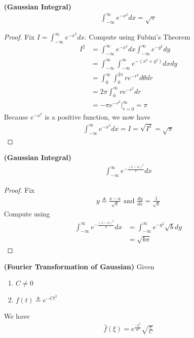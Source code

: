 \documentclass{report}
\begin{document}
\begin{theorem}
\label{Gau1} 
\textbf{(Gaussian Integral)} 
\begin{align*}
\int_{-\infty}^{\infty}e^{-x^2}dx=\sqrt{\pi} 
\end{align*}
\end{theorem}
\begin{proof}
Fix $I=\int_{-\infty}^{\infty}e^{-x^2}dx$. Compute using Fubini's Theorem 
\begin{align*}
I^2&=\int_{-\infty}^{\infty}e^{-x^2}dx\int_{-\infty}^{\infty}e^{-y^2}dy\\
&=\int_{-\infty}^{\infty}\int_{-\infty}^{\infty}e^{-(x^2+y^2)}dxdy\\
&=\int_0^{\infty}\int_{0}^{2\pi}re^{-r^2}d\theta dr\\
&=2\pi \int_0^{\infty}re^{-r^2}dr\\
&=-\pi e^{-r^2}\big|_{r=0}^{\infty}=\pi
\end{align*}
Because $e^{-x^2}$ is a positive function, we now have 
\begin{align*}
\int_{-\infty}^{\infty}e^{-x^2}dx=I=\sqrt{I^2}=\sqrt{\pi}  
\end{align*}
\end{proof}
\begin{theorem}
\label{Gau2}
\textbf{(Gaussian Integral)}
\begin{align*}
\int_{-\infty}^{\infty}e^{-\frac{(x-a)^2}{b}}dx
\end{align*}
\end{theorem}
\begin{proof}
Fix 
\begin{align*}
y\triangleq \frac{x-a}{\sqrt{b}}\text{ and }\frac{dy}{dx}=\frac{1}{\sqrt{b} }
\end{align*}
Compute using 
\begin{align*}
\int_{-\infty}^{\infty}e^{-\frac{(x-a)^2}{b}}dx&=\int_{-\infty}^{\infty}e^{-y^2}\sqrt{b} dy\\
&=\sqrt{b\pi} 
\end{align*}
\end{proof}
\begin{theorem}
\label{Fourier of Gaussian}
\textbf{(Fourier Transformation of Gaussian)} Given 
\begin{enumerate}[label=(\alph*)]
  \item $C\neq 0$
  \item $f(t)\triangleq e^{-Ct^2}$
\end{enumerate}
We have
\begin{align*}
\hat{f}(\xi)=e^{\frac{-\xi^2}{4C}}\sqrt{\frac{\pi}{C}} 
\end{align*}
\end{theorem}
\end{document}
